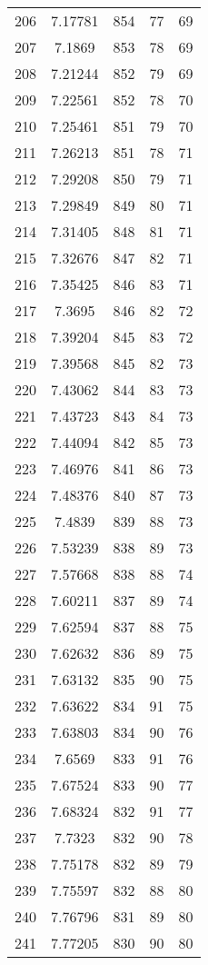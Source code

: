 \documentclass[12pt,a4paper]{article}
\begin{document}
\begin{tabular}{r|cccc}
	206 & 7.17781 & 854 & 77 & 69 \\
	207 & 7.1869 & 853 & 78 & 69 \\
	208 & 7.21244 & 852 & 79 & 69 \\
	209 & 7.22561 & 852 & 78 & 70 \\
	210 & 7.25461 & 851 & 79 & 70 \\
	211 & 7.26213 & 851 & 78 & 71 \\
	212 & 7.29208 & 850 & 79 & 71 \\
	213 & 7.29849 & 849 & 80 & 71 \\
	214 & 7.31405 & 848 & 81 & 71 \\
	215 & 7.32676 & 847 & 82 & 71 \\
	216 & 7.35425 & 846 & 83 & 71 \\
	217 & 7.3695 & 846 & 82 & 72 \\
	218 & 7.39204 & 845 & 83 & 72 \\
	219 & 7.39568 & 845 & 82 & 73 \\
	220 & 7.43062 & 844 & 83 & 73 \\
	221 & 7.43723 & 843 & 84 & 73 \\
	222 & 7.44094 & 842 & 85 & 73 \\
	223 & 7.46976 & 841 & 86 & 73 \\
	224 & 7.48376 & 840 & 87 & 73 \\
	225 & 7.4839 & 839 & 88 & 73 \\
	226 & 7.53239 & 838 & 89 & 73 \\
	227 & 7.57668 & 838 & 88 & 74 \\
	228 & 7.60211 & 837 & 89 & 74 \\
	229 & 7.62594 & 837 & 88 & 75 \\
	230 & 7.62632 & 836 & 89 & 75 \\
	231 & 7.63132 & 835 & 90 & 75 \\
	232 & 7.63622 & 834 & 91 & 75 \\
	233 & 7.63803 & 834 & 90 & 76 \\
	234 & 7.6569 & 833 & 91 & 76 \\
	235 & 7.67524 & 833 & 90 & 77 \\
	236 & 7.68324 & 832 & 91 & 77 \\
	237 & 7.7323 & 832 & 90 & 78 \\
	238 & 7.75178 & 832 & 89 & 79 \\
	239 & 7.75597 & 832 & 88 & 80 \\
	240 & 7.76796 & 831 & 89 & 80 \\
	241 & 7.77205 & 830 & 90 & 80 \\

\end{tabular}
\end{document}
